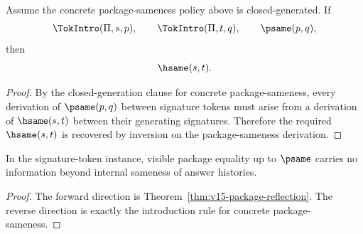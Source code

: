 \begin{theorem}
\label{thm:v15-package-reflection}
Assume the concrete package-sameness policy above is closed-generated. If
\[
  \TokIntro(\Pi,s,p),\qquad
  \TokIntro(\Pi,t,q),\qquad
  \psame(p,q),
\]
then
\[
  \hsame(s,t).
\]
\end{theorem}

\begin{proof}
By the closed-generation clause for concrete package-sameness, every derivation of \(\psame(p,q)\) between signature tokens must arise from a derivation of \(\hsame(s,t)\) between their generating signatures. Therefore the required \(\hsame(s,t)\) is recovered by inversion on the package-sameness derivation.
\end{proof}

\begin{corollary}
In the signature-token instance, visible package equality up to \(\psame\) carries no information beyond internal sameness of answer histories.
\end{corollary}

\begin{proof}
The forward direction is Theorem~\ref{thm:v15-package-reflection}. The reverse direction is exactly the introduction rule for concrete package-sameness.
\end{proof}
